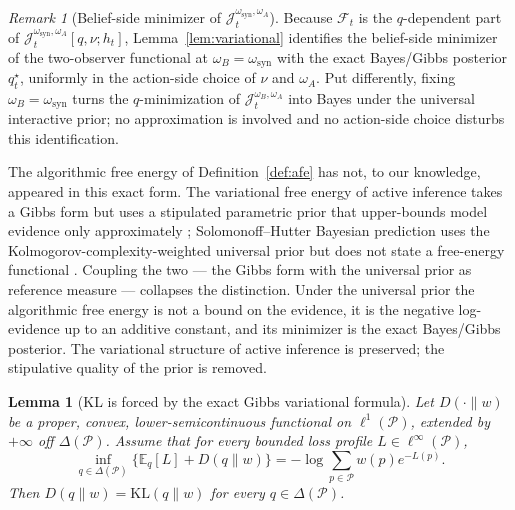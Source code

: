 \documentclass[11pt]{article}
\newtheorem{lemma}[theorem]{Lemma}
\theoremstyle{definition}
\theoremstyle{remark}
\newtheorem{remark}[theorem]{Remark}
\newcommand{\Pcal}{\mathcal{P}}
\newcommand{\Fcal}{\mathcal{F}}
\newcommand{\E}{\mathbb{E}}
\newcommand{\KL}{\mathrm{KL}}
\begin{document}
\begin{remark}[Belief-side minimizer of $\mathcal J_t^{\omega_{\mathrm{syn}},\omega_A}$]
\label{rem:afe-bayes-unification}
Because $\Fcal_t$ is the $q$-dependent part of $\mathcal J_t^{\omega_{\mathrm{syn}},\omega_A}[q,\nu;h_t]$, Lemma~\ref{lem:variational} identifies the belief-side minimizer of the two-observer functional at $\omega_B=\omega_{\mathrm{syn}}$ with the exact Bayes/Gibbs posterior $q_t^\star$, uniformly in the action-side choice of $\nu$ and $\omega_A$. Put differently, fixing $\omega_B=\omega_{\mathrm{syn}}$ turns the $q$-minimization of $\mathcal J_t^{\omega_B,\omega_A}$ into Bayes under the universal interactive prior; no approximation is involved and no action-side choice disturbs this identification.

The algorithmic free energy of Definition~\ref{def:afe} has not, to our knowledge, appeared in this exact form. The variational free energy of active inference takes a Gibbs form but uses a stipulated parametric prior that upper-bounds model evidence only approximately \citep{Friston2010,ParrFriston2019}; Solomonoff--Hutter Bayesian prediction uses the Kolmogorov-complexity-weighted universal prior but does not state a free-energy functional \citep{Solomonoff1964a,Solomonoff1964b,Hutter2005}. Coupling the two --- the Gibbs form with the universal prior as reference measure --- collapses the distinction. Under the universal prior the algorithmic free energy is not a bound on the evidence, it is the negative log-evidence up to an additive constant, and its minimizer is the exact Bayes/Gibbs posterior. The variational structure of active inference is preserved; the stipulative quality of the prior is removed.
\end{remark}

\begin{lemma}[KL is forced by the exact Gibbs variational formula]
\label{lem:kl-necessity}
Let $D(\cdot\|w)$ be a proper, convex, lower-semicontinuous functional on $\ell^1(\Pcal)$, extended by $+\infty$ off $\Delta(\Pcal)$. Assume that for every bounded loss profile $L\in\ell^\infty(\Pcal)$,
\[
\inf_{q\in\Delta(\Pcal)}\bigl\{\E_q[L]+D(q\|w)\bigr\}
=
-\log\sum_{p\in\Pcal} w(p)e^{-L(p)}.
\]
Then $D(q\|w)=\KL(q\|w)$ for every $q\in\Delta(\Pcal)$.
\end{lemma}
\end{document}
